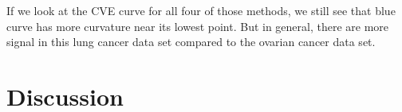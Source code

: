 \documentclass{article}\usepackage[]{graphicx}\usepackage[]{color}
\begin{document}
If we look at the CVE curve for all four of those methods, we still see that blue curve has more curvature near its lowest point. But in general, there are more signal in this lung cancer data set compared to the ovarian cancer data set.


\section{Discussion}



\end{document}
